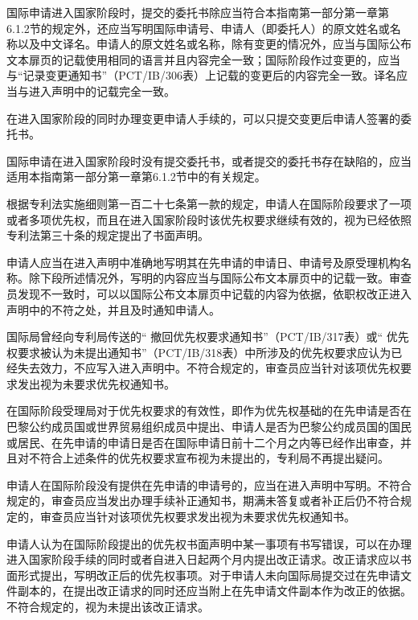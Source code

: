 国际申请进入国家阶段时，提交的委托书除应当符合本指南第一部分第一章第6.1.2节的规定外，还应当写明国际申请号、申请人（即委托人）的原文姓名或名称以及中文译名。申请人的原文姓名或名称，除有变更的情况外，应当与国际公布文本扉页的记载使用相同的语言并且内容完全一致；国际阶段作过变更的，应当与“记录变更通知书”（PCT/IB/306表）上记载的变更后的内容完全一致。译名应当与进入声明中的记载完全一致。

在进入国家阶段的同时办理变更申请人手续的，可以只提交变更后申请人签署的委托书。

国际申请在进入国家阶段时没有提交委托书，或者提交的委托书存在缺陷的，应当适用本指南第一部分第一章第6.1.2节中的有关规定。

根据专利法实施细则第一百二十七条第一款的规定，申请人在国际阶段要求了一项或者多项优先权，而且在进入国家阶段时该优先权要求继续有效的，视为已经依照专利法第三十条的规定提出了书面声明。

申请人应当在进入声明中准确地写明其在先申请的申请日、申请号及原受理机构名称。除下段所述情况外，写明的内容应当与国际公布文本扉页中的记载一致。审查员发现不一致时，可以以国际公布文本扉页中记载的内容为依据，依职权改正进入声明中的不符之处，并且及时通知申请人。

国际局曾经向专利局传送的“ 撤回优先权要求通知书”（PCT/IB/317表）或“ 优先权要求被认为未提出通知书”（PCT/IB/318表）中所涉及的优先权要求应认为已经失去效力，不应写入进入声明中。不符合规定的，审查员应当针对该项优先权要求发出视为未要求优先权通知书。

在国际阶段受理局对于优先权要求的有效性，即作为优先权基础的在先申请是否在巴黎公约成员国或世界贸易组织成员中提出、申请人是否为巴黎公约成员国的国民或居民、在先申请的申请日是否在国际申请日前十二个月之内等已经作出审查，并且对不符合上述条件的优先权要求宣布视为未提出的，专利局不再提出疑问。

申请人在国际阶段没有提供在先申请的申请号的，应当在进入声明中写明。不符合规定的，审查员应当发出办理手续补正通知书，期满未答复或者补正后仍不符合规定的，审查员应当针对该项优先权要求发出视为未要求优先权通知书。

申请人认为在国际阶段提出的优先权书面声明中某一事项有书写错误，可以在办理进入国家阶段手续的同时或者自进入日起两个月内提出改正请求。改正请求应以书面形式提出，写明改正后的优先权事项。对于申请人未向国际局提交过在先申请文件副本的，在提出改正请求的同时还应当附上在先申请文件副本作为改正的依据。不符合规定的，视为未提出该改正请求。

